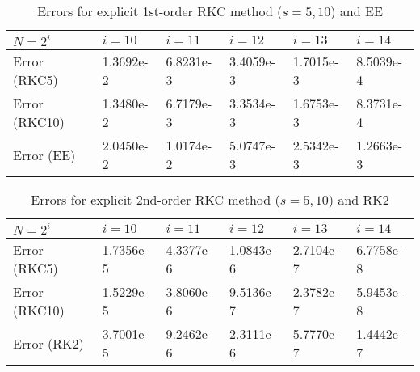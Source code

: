 \documentclass{article}
\theoremstyle{theorem}
\theoremstyle{definition}
\begin{document}
\begin{table}	
	\begin{tabular}{ | m{1.5cm} | m{1.5cm}|  m{1.5cm}| m{1.5cm}| m{1.5cm}| m{1.5cm}|  }
		\hline
		$N=2^i$ & $i=10$ &  $i=11$ & $i=12$ & $i=13$ &  $i=14$  \\ 
		\hline
		Error (RKC5) & 1.3692e-2  & 6.8231e-3 & 3.4059e-3 & 1.7015e-3 & 8.5039e-4 \\
		\hline
		Error (RKC10) & 1.3480e-2  & 6.7179e-3 & 3.3534e-3 & 1.6753e-3 & 8.3731e-4 \\
		\hline
		Error (EE) &2.0450e-2 &1.0174e-2 &5.0747e-3 &2.5342e-3 & 1.2663e-3 \\
		\hline		
	\end{tabular}		
	\caption{Errors for explicit 1st-order RKC method ($s=5,10$) and EE }
\end{table}	
		
			\begin{table}	
		\begin{tabular}{ | m{1.5cm} | m{1.5cm}|  m{1.5cm}| m{1.5cm}| m{1.5cm}| m{1.5cm}|  }
	\hline
	$N=2^i$ & $i=10$ &  $i=11$ & $i=12$ & $i=13$ &  $i=14$  \\ 
		\hline
		Error (RKC5) & 1.7356e-5  & 4.3377e-6 & 1.0843e-6 & 2.7104e-7 & 6.7758e-8  \\
		\hline
		Error (RKC10) & 1.5229e-5  & 3.8060e-6 & 9.5136e-7 & 2.3782e-7 & 5.9453e-8  \\
			\hline
		Error (RK2) &3.7001e-5 &9.2462e-6 &2.3111e-6 &5.7770e-7 & 1.4442e-7 \\
		\hline
		
	\end{tabular}	
\caption{Errors for explicit 2nd-order RKC method ($s=5,10$) and RK2 }
\end{table}
\end{document}
